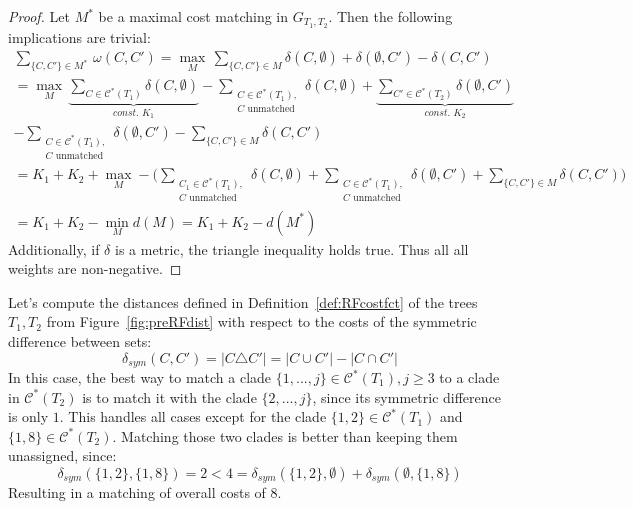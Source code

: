 \begin{proof}
Let $M^*$ be a maximal cost matching in $G_{T_1, T_2}$. Then the following implications are trivial:
\begin{gather*}
\sum_{\{C,C'\} \in M^*} \, \omega(C, C') = \max_{M} \, \sum_{\{C,C'\} \in M} \delta(C,\emptyset) + \delta(\emptyset, C') - \delta(C,C') \\
= \max_{M} \, \underbrace{\sum_{C \in \mathcal{C}^*(T_1)} \delta(C,\emptyset)}_{\textit{const. }K_1} - \sum_{\substack{C \in \mathcal{C}^*(T_1),\\ C\text{ unmatched}}} \delta(C,\emptyset) + \underbrace{\sum_{C' \in \mathcal{C}^*(T_2)} \delta(\emptyset, C')}_{\textit{const. }K_2} \\
- \sum_{\substack{C \in \mathcal{C}^*(T_1),\\ C\text{ unmatched}}} \delta(\emptyset, C') - \sum_{\{C,C'\} \in M} \delta(C,C')\\
= K_1 + K_2 + \max_{M} - \bigg( \sum_{\substack{C_1 \in \mathcal{C}^*(T_1),\\ C\text{ unmatched}}} \delta(C, \emptyset) + \sum_{\substack{C \in \mathcal{C}^*(T_1),\\ C\text{ unmatched}}} \delta(\emptyset, C') + \sum_{\{C,C'\} \in M} \delta(C,C') \bigg)\\
= K_1 + K_2 - \min_{M} d(M) = K_1 + K_2 - d(M^*)
\end{gather*}
Additionally, if $\delta$ is a metric, the triangle inequality holds true. Thus all all weights are non-negative.
\end{proof}
Let's compute the distances defined in Definition~\ref{def:RFcostfct} of the trees $T_1, T_2$ from Figure~\ref{fig:preRFdist} with respect to the costs of the symmetric difference between sets:
$$\delta_{sym}(C, C') = |C \triangle C'| = |C \cup C'| - |C \cap C'|$$
In this case, the best way to match a clade $\{1,...,j\} \in \mathcal{C}^*(T_1), j \geq 3$ to a clade in $\mathcal{C}^*(T_2)$ is to match it with the clade $\{2,...,j\}$, since its symmetric difference is only $1$. This handles all cases except for the clade $\{1,2\} \in \mathcal{C}^*(T_1)$ and $\{1,8\} \in \mathcal{C}^*(T_2)$. Matching those two clades is better than keeping them unassigned, since:
$$\delta_{sym}(\{1,2\},\{1,8\}) = 2 < 4 = \delta_{sym}(\{1,2\},\emptyset) + \delta_{sym}(\emptyset, \{1,8\})$$
Resulting in a matching of overall costs of $8$. 

